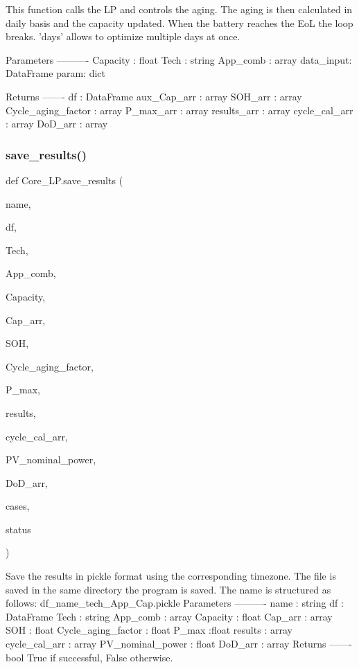 \begin{DoxyVerb}This function calls the LP and controls the aging. The aging is then
calculated in daily basis and the capacity updated. When the battery
reaches the EoL the loop breaks. 'days' allows to optimize multiple days at once.

Parameters
----------
Capacity : float
Tech : string
App_comb : array
data_input: DataFrame
param: dict

Returns
-------
df : DataFrame
aux_Cap_arr : array
SOH_arr : array
Cycle_aging_factor : array
P_max_arr : array
results_arr : array
cycle_cal_arr : array
DoD_arr : array
\end{DoxyVerb}
 \mbox{\label{namespace_core___l_p_aca557201a95921203db9daff85af5445}} 
\subsubsection{\texorpdfstring{save\+\_\+results()}{save\_results()}}
{\footnotesize\ttfamily def Core\+\_\+\+L\+P.\+save\+\_\+results (\begin{DoxyParamCaption}\item[{}]{name,  }\item[{}]{df,  }\item[{}]{Tech,  }\item[{}]{App\+\_\+comb,  }\item[{}]{Capacity,  }\item[{}]{Cap\+\_\+arr,  }\item[{}]{S\+OH,  }\item[{}]{Cycle\+\_\+aging\+\_\+factor,  }\item[{}]{P\+\_\+max,  }\item[{}]{results,  }\item[{}]{cycle\+\_\+cal\+\_\+arr,  }\item[{}]{P\+V\+\_\+nominal\+\_\+power,  }\item[{}]{Do\+D\+\_\+arr,  }\item[{}]{cases,  }\item[{}]{status }\end{DoxyParamCaption})}

\begin{DoxyVerb}Save the results in pickle format using the corresponding timezone.
The file is saved in the same directory the program is saved.
The name is structured as follows: df_name_tech_App_Cap.pickle
Parameters
----------
name : string
df : DataFrame
Tech : string
App_comb : array
Capacity : float
Cap_arr : array
SOH : float
Cycle_aging_factor : float
P_max :float
results : array
cycle_cal_arr : array
PV_nominal_power : float
DoD_arr : array
Returns
-------
bool
    True if successful, False otherwise.
\end{DoxyVerb}
 \mbox{\label{namespace_core___l_p_aac48b8438d780ef78c7c7024106d0273}} 
